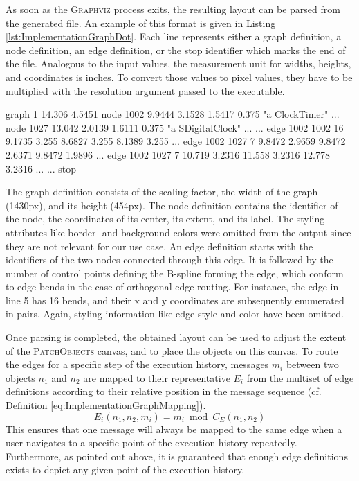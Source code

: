 As soon as the \textsc{Graphviz} process exits, the resulting layout can be parsed from the generated file.
An example of this  format is given in Listing \ref{lst:ImplementationGraphDot}.
Each line represents either a graph definition, a node definition, an edge definition, or the stop identifier which marks the end of the file.
Analogous to the input values, the measurement unit for widths, heights, and coordinates is inches.
To convert those values to pixel values, they have to be multiplied with the resolution argument passed to the  executable.

\begin{graphviz}[caption={Output in plain-ext format as produced by \textsc{Graphviz} for the input from Listing \ref{lst:ImplementationGraphDot}}, label=lst:ImplementationGraphPlainExt]
graph 1 14.306 4.5451
node 1002 9.9444 3.1528 1.5417 0.375 "a ClockTimer" ...
node 1027 13.042 2.0139 1.6111 0.375 "a SDigitalClock" ...
...
edge 1002 1002 16 9.1735 3.255 8.6827 3.255 8.1389 3.255 ...
edge 1002 1027 7 9.8472 2.9659 9.8472 2.6371 9.8472 1.9896 ...
edge 1002 1027 7 10.719 3.2316 11.558 3.2316 12.778 3.2316 ...
...
stop
\end{graphviz}

The graph definition consists of the scaling factor, the width of the graph (1430px), and its height (454px).
The node definition contains the identifier of the node, the coordinates of its center, its extent, and its label.
The styling attributes like border- and background-colors were omitted from the output since they are not relevant for our use case.
An edge definition starts with the identifiers of the two nodes connected through this edge.
It is followed by the number of control points defining the B-spline forming the edge, which conform to edge bends in the case of orthogonal edge routing.
For instance, the edge in line 5 has 16 bends, and their x and y coordinates are subsequently enumerated in pairs.
Again, styling information like edge style and color have been omitted.

Once parsing is completed, the obtained layout can be used to adjust the extent of the \textsc{PatchObjects} canvas, and to place the objects on this canvas.
To route the edges for a specific step of the execution history, messages $m_i$ between two objects $n_1$ and $n_2$ are mapped to their representative $E_i$ from the multiset of edge definitions according to their relative position in the message sequence (cf. Definition \ref{eq:ImplementationGraphMapping}).
\begin{equation}
E_i(n_1, n_2, m_i) = m_i \bmod C_E(n_1, n_2)
\label{eq:ImplementationGraphMapping}
\end{equation}
This ensures that one message will always be mapped to the same edge when a user navigates to a specific point of the execution history repeatedly.
Furthermore, as pointed out above, it is guaranteed that enough edge definitions exists to depict any given point of the execution history.